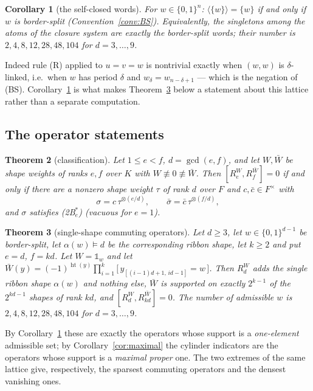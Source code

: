 \documentclass[11pt]{article}
\newtheorem{theorem}{Theorem}[section]
\newtheorem{corollary}[theorem]{Corollary}
\theoremstyle{definition}
\theoremstyle{remark}
\newcommand{\Fld}{F}                     %
\newcommand{\cube}{\{0,1\}}
\newcommand{\hgt}{\operatorname{ht}}     %
\newcommand{\one}{\mathbb{1}}
\begin{document}
\begin{corollary}[the self-closed words]\label{cor:selfclosed}
For $w\in\cube^{n}$: $\langle\{w\}\rangle=\{w\}$ if and only if $w$ is border-split
(Convention~\ref{conv:BS}).  Equivalently, the singletons among the atoms of the closure
system are exactly the border-split words; their number is $2,4,8,12,28,48,104$ for
$d=3,\dots,9$.
\end{corollary}

Indeed rule (R) applied to $u=v=w$ is nontrivial exactly when $(w,w)$ is $\delta$-linked, i.e.\
when $w$ has period $\delta$ and $w_\delta=w_{n-\delta+1}$ --- which is the negation of (BS).
Corollary~\ref{cor:selfclosed} is what makes Theorem~\ref{thm:single} below a statement about
this lattice rather than a separate computation.

\subsection{The operator statements}\label{sec:res-class}

\begin{theorem}[classification]\label{thm:main}
Let $1\le e<f$, $d=\gcd(e,f)$, and let $W,\bar W$ be shape weights of ranks $e,f$ over $K$
with $W\not\equiv0\not\equiv\bar W$.  Then $[R_e^{W},R_f^{\bar W}]=0$ if and only if there are
a nonzero shape weight $\tau$ of rank $d$ over $\Fld$ and $c,\bar c\in\Fld^{\times}$ with
\[
   \sigma=c\,\tau^{\otimes(e/d)},\qquad \bar\sigma=\bar c\,\tau^{\otimes(f/d)},
\]
and $\sigma$ satisfies \textnormal{(2B$^{*}_e$)} (vacuous for $e=1$).
\end{theorem}

\begin{theorem}[single-shape commuting operators]\label{thm:single}
Let $d\ge3$, let $w\in\cube^{d-1}$ be border-split, let $\alpha(w)\models d$ be the
corresponding ribbon shape, let $k\ge2$ and put $e=d$, $f=kd$.  Let $W=\one_w$ and let
$\bar W(y)=(-1)^{\hgt(y)}\prod_{i=1}^{k}\bigl[\,y_{[(i-1)d+1,\,id-1]}=w\,\bigr]$.  Then
$R_d^{W}$ adds the single ribbon shape $\alpha(w)$ and nothing else, $\bar W$ is supported on
exactly $2^{k-1}$ of the $2^{kd-1}$ shapes of rank $kd$, and
$[R_d^{W},R_{kd}^{\bar W}]=0$.  The number of admissible $w$ is
$2,4,8,12,28,48,104$ for $d=3,\dots,9$.
\end{theorem}

By Corollary~\ref{cor:selfclosed} these are exactly the operators whose support is a
\emph{one-element} admissible set; by Corollary~\ref{cor:maximal} the cylinder indicators are
the operators whose support is a \emph{maximal proper} one.  The two extremes of the same
lattice give, respectively, the sparsest commuting operators and the densest vanishing ones.
\end{document}
